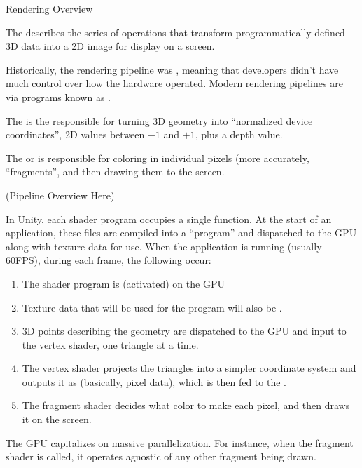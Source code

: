 \documentclass[11pt]{article}
\begin{document}
\begin{topic}{Rendering Overview}
	\item The  describes the series of operations that transform programmatically defined 3D data into a 2D image for display on a screen.
	\item Historically, the rendering pipeline was , meaning that developers didn't have much control over how the hardware operated. Modern rendering pipelines are  via programs known as .
	\item The  is the responsible for turning 3D geometry into ``normalized device coordinates'', 2D values between $-1$ and $+1$, plus a depth value.
	\item The  or  is responsible for coloring in individual pixels (more accurately, ``fragments'', and then drawing them to the screen.
	\item (Pipeline Overview Here)
	\item In Unity, each shader program occupies a single function. At the start of an application, these files are compiled into a ``program'' and dispatched to the GPU along with texture data for use. When the application is running (usually 60FPS), during each frame, the following occur:
	\begin{enumerate}
		\item The shader program is  (activated) on the GPU
		\item Texture data that will be used for the program will also be .
		\item 3D points describing the geometry are dispatched to the GPU and input to the vertex shader, one triangle at a time.
		\item The vertex shader projects the triangles into a simpler coordinate system and outputs it as  (basically, pixel data), which is then fed to the .
		\item The fragment shader decides what color to make each pixel, and then draws it on the screen.
	\end{enumerate}
	\item The GPU capitalizes on massive parallelization. For instance, when the fragment shader is called, it operates agnostic of any other fragment being drawn.
\end{topic}
\end{document}
